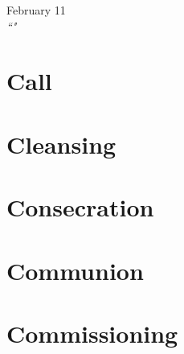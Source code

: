 \documentclass[11pt,letterpaper]{article}
\newcommand{\wdMonth}{February}
\newcommand{\wdDay}{11}
\begin{document}
{\huge \wdMonth{} \wdDay}\\[0.2mm]

\textit{\centering ``"}

\section{Call}

\section{Cleansing}

\section{Consecration}

\section{Communion}

\section{Commissioning}
\end{document}
